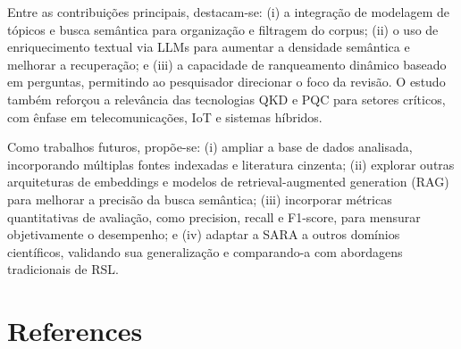 \documentclass{siintec}
\begin{document}
Entre as contribuições principais, destacam-se: (i) a integração de modelagem de tópicos e busca semântica para organização e filtragem do corpus; (ii) o uso de enriquecimento textual via LLMs para aumentar a densidade semântica e melhorar a recuperação; e (iii) a capacidade de ranqueamento dinâmico baseado em perguntas, permitindo ao pesquisador direcionar o foco da revisão. O estudo também reforçou a relevância das tecnologias QKD e PQC para setores críticos, com ênfase em telecomunicações, IoT e sistemas híbridos.

Como trabalhos futuros, propõe-se: (i) ampliar a base de dados analisada, incorporando múltiplas fontes indexadas e literatura cinzenta; (ii) explorar outras arquiteturas de embeddings e modelos de retrieval-augmented generation (RAG) para melhorar a precisão da busca semântica; (iii) incorporar métricas quantitativas de avaliação, como precision, recall e F1-score, para mensurar objetivamente o desempenho; e (iv) adaptar a SARA a outros domínios científicos, validando sua generalização e comparando-a com abordagens tradicionais de RSL.





\section*{References}

\end{document}

